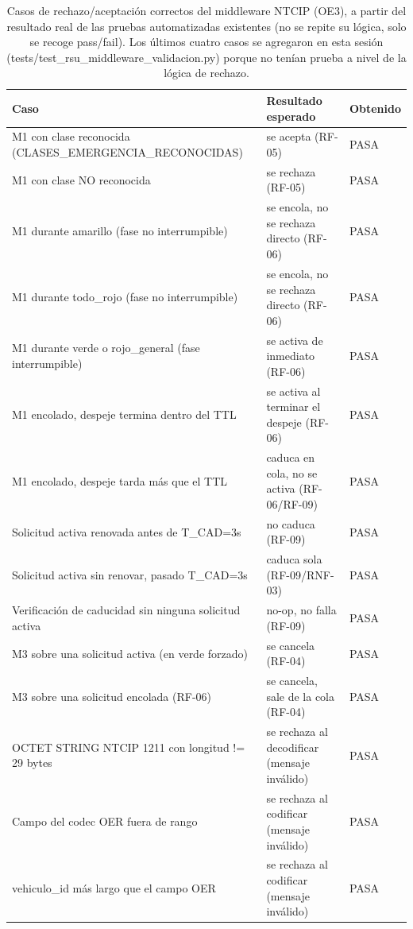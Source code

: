 \begin{table}[H]
\centering
\caption{Casos de rechazo/aceptación correctos del middleware NTCIP (OE3), a partir del resultado real de las pruebas automatizadas existentes (no se repite su lógica, solo se recoge pass/fail). Los últimos cuatro casos se agregaron en esta sesión (tests/test\_rsu\_middleware\_validacion.py) porque no tenían prueba a nivel de la lógica de rechazo.}
\label{tab:ntcip_rechazo}
\small
\begin{tabular}{p{5.2cm}p{4.5cm}p{1.6cm}}
\toprule
\textbf{Caso} & \textbf{Resultado esperado} & \textbf{Obtenido} \\
\midrule
M1 con clase reconocida (CLASES\_EMERGENCIA\_RECONOCIDAS) & se acepta (RF-05) & PASA \\
M1 con clase NO reconocida & se rechaza (RF-05) & PASA \\
M1 durante amarillo (fase no interrumpible) & se encola, no se rechaza directo (RF-06) & PASA \\
M1 durante todo\_rojo (fase no interrumpible) & se encola, no se rechaza directo (RF-06) & PASA \\
M1 durante verde o rojo\_general (fase interrumpible) & se activa de inmediato (RF-06) & PASA \\
M1 encolado, despeje termina dentro del TTL & se activa al terminar el despeje (RF-06) & PASA \\
M1 encolado, despeje tarda más que el TTL & caduca en cola, no se activa (RF-06/RF-09) & PASA \\
Solicitud activa renovada antes de T\_CAD=3s & no caduca (RF-09) & PASA \\
Solicitud activa sin renovar, pasado T\_CAD=3s & caduca sola (RF-09/RNF-03) & PASA \\
Verificación de caducidad sin ninguna solicitud activa & no-op, no falla (RF-09) & PASA \\
M3 sobre una solicitud activa (en verde forzado) & se cancela (RF-04) & PASA \\
M3 sobre una solicitud encolada (RF-06) & se cancela, sale de la cola (RF-04) & PASA \\
OCTET STRING NTCIP 1211 con longitud != 29 bytes & se rechaza al decodificar (mensaje inválido) & PASA \\
Campo del codec OER fuera de rango & se rechaza al codificar (mensaje inválido) & PASA \\
vehiculo\_id más largo que el campo OER & se rechaza al codificar (mensaje inválido) & PASA \\

\end{tabular}
\end{table}
